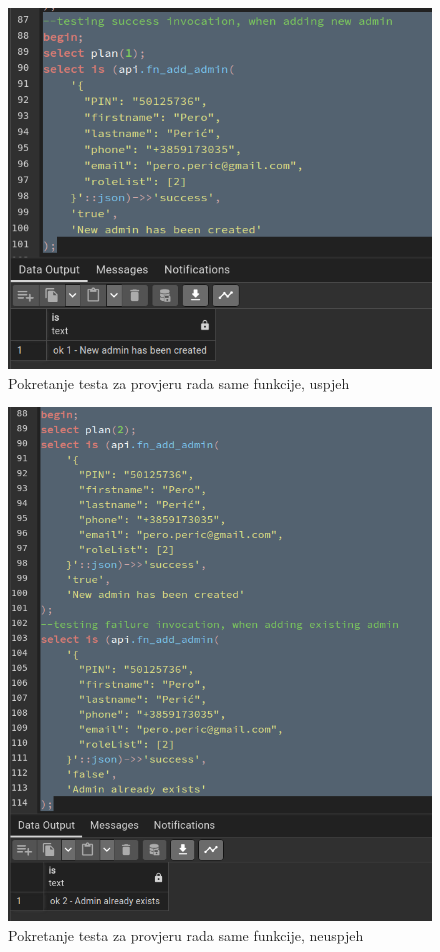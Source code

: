 				\begin{figure}[H]
					\centering
					\includegraphics[width=\textwidth]{slike/unit_tests/ut_2/success_invocation.png}
					\caption{Pokretanje testa za provjeru rada same funkcije, uspjeh}
					\label{fig: IS2-uspješno kreiran administrator}
				\end{figure}
				\begin{figure}[H]
					\centering
					\includegraphics[width=\textwidth]{slike/unit_tests/ut_2/failure_invocation.png}
					\caption{Pokretanje testa za provjeru rada same funkcije, neuspjeh}
					\label{fig: IS2-administrator nije kreiran, već postoji isti}
				\end{figure}
